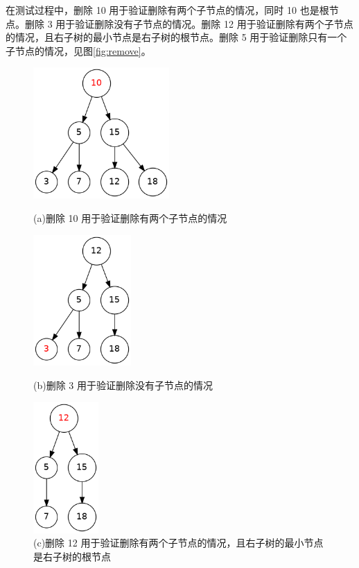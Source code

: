 \documentclass[UTF8]{ctexart}
\begin{document}
在测试过程中，删除 10 用于验证删除有两个子节点的情况，同时 10 也是根节点。删除 3 用于验证删除没有子节点的情况。删除 12 用于验证删除有两个子节点的情况，且右子树的最小节点是右子树的根节点。删除 5 用于验证删除只有一个子节点的情况，见图\ref{fig:remove}。
\begin{figure}[H]
    \centering
    \begin{minipage}[b]{0.45\textwidth}
        \centering
        \includegraphics[height=5cm]{./img/1.png}
        \caption*{(a)删除 10 用于验证删除有两个子节点的情况}
    \end{minipage}
    \hfill
    \begin{minipage}[b]{0.45\textwidth}
        \centering
        \includegraphics[height=5cm]{./img/2.png}
        \caption*{(b)删除 3 用于验证删除没有子节点的情况}
    \end{minipage}
    \vfill
    \begin{minipage}[b]{0.45\textwidth}
        \centering
        \includegraphics[height=5cm]{./img/3.png}
        \caption*{(c)删除 12 用于验证删除有两个子节点的情况，且右子树的最小节点是右子树的根节点}

\end{minipage}
\end{figure}
\end{document}
